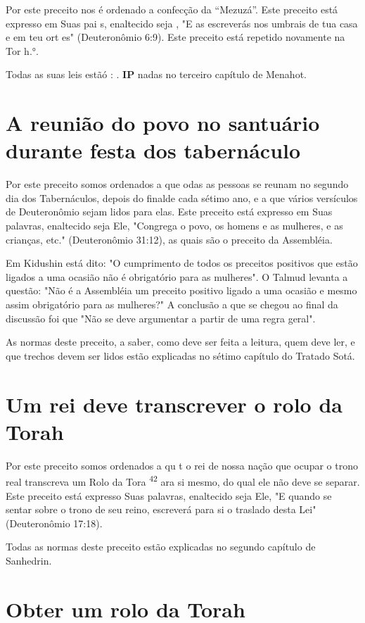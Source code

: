 Por este preceito nos é ordenado a confecção da ``Mezuzá''. Este
preceito está expresso em Suas pai s, enaltecido seja , "E as escreverás
nos umbrais de tua casa e em teu ort es" (Deuteronômio 6:9). Este
preceito está repetido novamente na Tor h.°.


Todas as suas leis estãó : . \textbf{IP} nadas no terceiro capítulo de
Menahot.



\section{A reunião do povo no santuário durante festa dos tabernáculo}

Por este preceito somos ordenados a que odas as pessoas se reu­nam no
segundo dia dos Tabernáculos, depois do finalde cada sétimo ano, e a que
vários versículos de Deuteronômio sejam lidos para elas. Este preceito
está expresso em Suas palavras, enaltecido seja Ele, "Congrega o povo,
os ho­mens e as mulheres, e as crianças, etc." (Deuteronômio 31:12), as
quais são o preceito da Assembléia.

Em Kidushin está dito: "O cumprimento de todos os preceitos posi­tivos
que estão ligados a uma ocasião não é obrigatório para as mulheres". O
Talmud levanta a questão: "Não é a Assembléia um preceito positivo
ligado a uma ocasião e mesmo assim obrigatório para as mulheres?" A
conclusão a que se chegou ao final da discussão foi que "Não se deve
argumentar a partir de uma regra geral".

As normas deste preceito, a saber, como deve ser feita a leitura, quem
deve ler, e que trechos devem ser lidos estão explicadas no sétimo
capítulo do Tratado Sotá.

\section{Um rei deve transcrever o rolo da Torah}

Por este preceito somos ordenados a qu t o rei de nossa nação que ocupar
o trono real transcreva um Rolo da Tora \textsuperscript{42} ara si
mesmo, do qual ele não deve se separar. Este preceito está expresso Suas
palavras, enalteci­do seja Ele, "E quando se sentar sobre o trono de seu
reino, escreverá para si o traslado desta Lei" (Deuteronômio 17:18).

Todas as normas deste preceito estão explicadas no segundo capítu­lo de
Sanhedrin.

\section{Obter um rolo da Torah}



